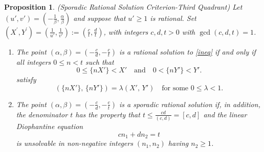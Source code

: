 \documentclass[12pt,letterpaper, reqno]{amsart}
\newtheorem{prop}[thm]{Proposition}
\theoremstyle{definition}
\theoremstyle{remark}
\newcommand{\ZZ}{\ensuremath{\mathbb{Z}}}
\newcommand{\uu}{{u'}}
\newcommand{\vv}{{v'}}
\begin{document}
\begin{prop} \label{prop:sporadic-rational}
{ \rm (Sporadic Rational Solution Criterion-Third Quadrant)} 
Let  $(\uu, \vv) = (-\frac{1}{\beta}, \frac{\alpha}{\beta})$ and suppose that ${\uu} \ge  1$ is rational.
Set $(X^{'}, Y^{'}) = (\frac{1}{\uu}, \frac1{\vv}) := (\frac{c}{t}, \frac{d}{t})$, with integers $c,d, t >0$ with $\gcd(c, d, t)=1$.
\begin{enumerate}
\item[(i)]
The point $(\alpha, \beta)=(- \frac{c}{d}, - \frac{c}{t})$ is a  rational solution to \eqref{ineq}  if and only if 
all integers  $0 \le n < t$ such that
$$
0 \le  \{ nX'\} <  X' \quad \mbox{and} \quad  0 < \{ n Y'\} <   Y'.
$$
satisfy 
\begin{equation}
(\{ nX'\}, \, \{nY'\}) = \lambda (X',\, Y')\quad \text{for some }0\leq\lambda <1.
\end{equation}
\item[(ii)]
The point $(\alpha, \beta)=(- \frac{c}{d}, - \frac{c}{t})$ is a sporadic rational solution if, in addition,
the denominator $t$ has the property  that $t \le \frac{cd}{(c,d)} = {[c,d]}$ and the  linear
Diophantine equation 
\begin{equation}\label{eq:Frob1}
c n_1 + dn_2= t
\end{equation}
is unsolvable in non-negative integers $(n_1,n_2)$ having $n_2 \ge 1$. 
\end{enumerate}
\end{prop}
\end{document}
